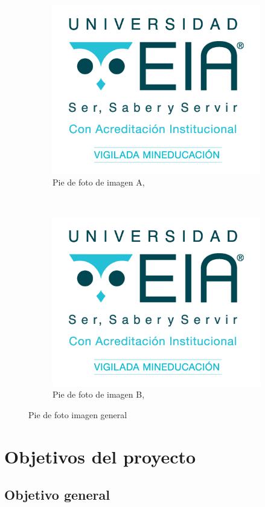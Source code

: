 \documentclass[11pt]{report} %
\begin{document}
\begin{figure}[H]
	\centering
	\begin{subfigure}{.5\textwidth}
		\centering
		\includegraphics[width=0.65\linewidth]{assets/imgs/logoeia.png}
		\caption{Pie de foto de imagen A, \cite{CITA1}}
		\label{Fig: figure1name}
	\end{subfigure}~
	\begin{subfigure}{.5\textwidth}
		\centering
		\includegraphics[width=0.65\linewidth]{assets/imgs/logoeia.png}
		\caption{Pie de foto de imagen B, \cite{CITA2}}
		\label{Fig: figure2name}
	\end{subfigure}%
	\caption{Pie de foto imagen general}
	\label{Fig: figurename}
\end{figure}



\section{Objetivos del proyecto}

\subsection{Objetivo general}
\end{document}
